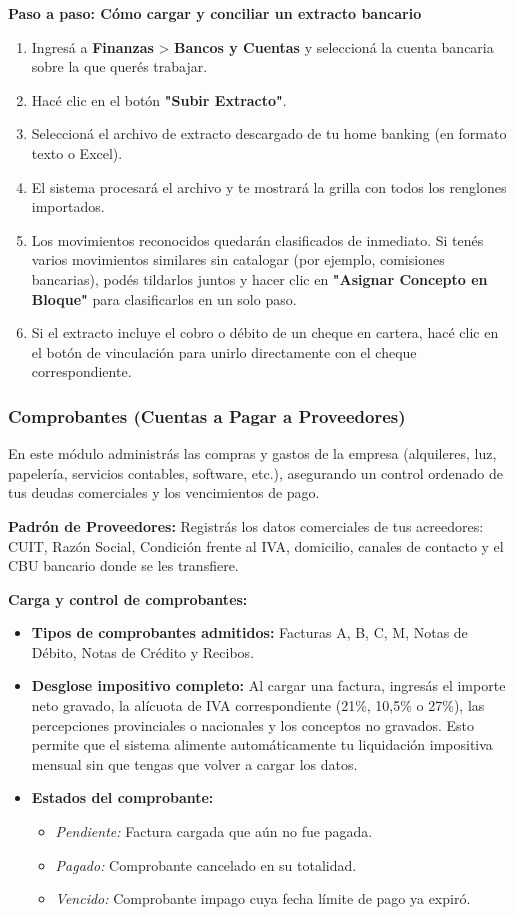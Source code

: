 \documentclass[12pt,a4paper]{article}
\renewcommand{\_}{\textunderscore\allowbreak}
\begin{document}
\textbf{Paso a paso: Cómo cargar y conciliar un extracto bancario}
\begin{enumerate}
    \item Ingresá a \textbf{Finanzas} > \textbf{Bancos y Cuentas} y seleccioná la cuenta bancaria sobre la que querés trabajar.
    \item Hacé clic en el botón \textbf{"Subir Extracto"}.
    \item Seleccioná el archivo de extracto descargado de tu home banking (en formato texto o Excel).
    \item El sistema procesará el archivo y te mostrará la grilla con todos los renglones importados.
    \item Los movimientos reconocidos quedarán clasificados de inmediato. Si tenés varios movimientos similares sin catalogar (por ejemplo, comisiones bancarias), podés tildarlos juntos y hacer clic en \textbf{"Asignar Concepto en Bloque"} para clasificarlos en un solo paso.
    \item Si el extracto incluye el cobro o débito de un cheque en cartera, hacé clic en el botón de vinculación para unirlo directamente con el cheque correspondiente.
\end{enumerate}

\subsubsection{Comprobantes (Cuentas a Pagar a Proveedores)}
En este módulo administrás las compras y gastos de la empresa (alquileres, luz, papelería, servicios contables, software, etc.), asegurando un control ordenado de tus deudas comerciales y los vencimientos de pago.

\textbf{Padrón de Proveedores:}
Registrás los datos comerciales de tus acreedores: CUIT, Razón Social, Condición frente al IVA, domicilio, canales de contacto y el CBU bancario donde se les transfiere.

\textbf{Carga y control de comprobantes:}
\begin{itemize}
    \item \textbf{Tipos de comprobantes admitidos:} Facturas A, B, C, M, Notas de Débito, Notas de Crédito y Recibos.
    \item \textbf{Desglose impositivo completo:} Al cargar una factura, ingresás el importe neto gravado, la alícuota de IVA correspondiente (21\%, 10,5\% o 27\%), las percepciones provinciales o nacionales y los conceptos no gravados. Esto permite que el sistema alimente automáticamente tu liquidación impositiva mensual sin que tengas que volver a cargar los datos.
    \item \textbf{Estados del comprobante:}
          \begin{itemize}
              \item \textit{Pendiente:} Factura cargada que aún no fue pagada.
              \item \textit{Pagado:} Comprobante cancelado en su totalidad.
              \item \textit{Vencido:} Comprobante impago cuya fecha límite de pago ya expiró.
          \end{itemize}
\end{itemize}
\end{document}
